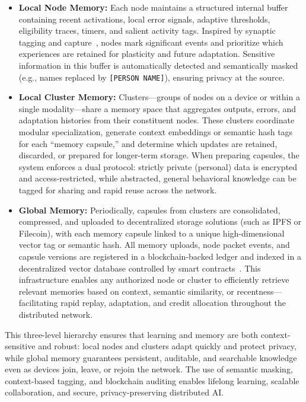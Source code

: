 \documentclass[11pt]{article}
\begin{document}
\begin{itemize}
    \item \textbf{Local Node Memory:} Each node maintains a structured internal buffer containing recent activations, local error signals, adaptive thresholds, eligibility traces, timers, and salient activity tags. Inspired by synaptic tagging and capture~\cite{Frey1997}, nodes mark significant events and prioritize which experiences are retained for plasticity and future adaptation. Sensitive information in this buffer is automatically detected and semantically masked (e.g., names replaced by \texttt{[PERSON NAME]}), ensuring privacy at the source.

    \item \textbf{Local Cluster Memory:} Clusters—groups of nodes on a device or within a single modality—share a memory space that aggregates outputs, errors, and adaptation histories from their constituent nodes. These clusters coordinate modular specialization, generate context embeddings or semantic hash tags for each “memory capsule,” and determine which updates are retained, discarded, or prepared for longer-term storage. When preparing capsules, the system enforces a dual protocol: strictly private (personal) data is encrypted and access-restricted, while abstracted, general behavioral knowledge can be tagged for sharing and rapid reuse across the network.

    \item \textbf{Global Memory:} Periodically, capsules from clusters are consolidated, compressed, and uploaded to decentralized storage solutions (such as IPFS or Filecoin), with each memory capsule linked to a unique high-dimensional vector tag or semantic hash. All memory uploads, node packet events, and capsule versions are registered in a blockchain-backed ledger and indexed in a decentralized vector database controlled by smart contracts~\cite{Petrosyan2023, Zyskind2015}. This infrastructure enables any authorized node or cluster to efficiently retrieve relevant memories based on context, semantic similarity, or recentness—facilitating rapid replay, adaptation, and credit allocation throughout the distributed network.
\end{itemize}

This three-level hierarchy ensures that learning and memory are both context-sensitive and robust: local nodes and clusters adapt quickly and protect privacy, while global memory guarantees persistent, auditable, and searchable knowledge even as devices join, leave, or rejoin the network. The use of semantic masking, context-based tagging, and blockchain auditing enables lifelong learning, scalable collaboration, and secure, privacy-preserving distributed AI.
\end{document}
